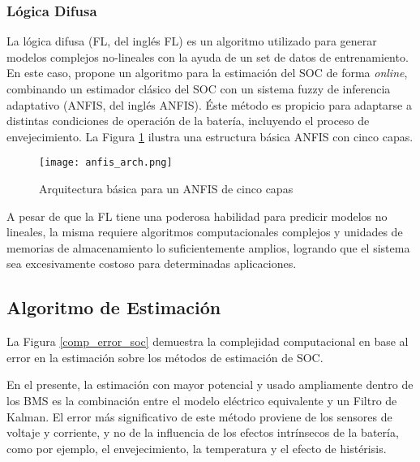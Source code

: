 \subsubsection{L\'ogica Difusa}

\noindent La l\'ogica difusa (\acrshort{FL}, del ingl\'es \acrlong{FL}) es un
algoritmo utilizado para generar modelos complejos no-lineales con la ayuda de
un set de datos de entrenamiento. En este caso, \cite{DAI2015350} propone un 
algoritmo para la estimaci\'on del \acrshort{SOC} de forma \emph{online},
combinando un estimador cl\'asico del \acrshort{SOC} con un sistema fuzzy de
inferencia adaptativo (\acrshort{ANFIS}, del ingl\'es \acrlong{ANFIS}). \'Este
m\'etodo es propicio para adaptarse a distintas condiciones de operaci\'on de la
bater\'ia, incluyendo el proceso de envejecimiento. La Figura \ref{anfis_arch}
ilustra una estructura b\'asica \acrshort{ANFIS} con cinco capas.

\begin{figure}[h!]
    \begin{center}
        \texttt{[image: anfis\_arch.png]}
        \caption{Arquitectura b\'asica para un \acrshort{ANFIS} de cinco capas}
        \label{anfis_arch}
    \end{center}
\end{figure}

\noindent A pesar de que la \acrshort{FL} tiene una poderosa habilidad para 
predicir modelos no lineales, la misma requiere algoritmos computacionales 
complejos y unidades de memorias de almacenamiento lo suficientemente amplios, 
logrando que el sistema sea excesivamente costoso para determinadas 
aplicaciones.

\newpage

\subsection{Algoritmo de Estimaci\'on}

\noindent La Figura \ref{comp_error_soc} demuestra la complejidad computacional 
en base al error en la estimaci\'on sobre los m\'etodos de estimaci\'on de 
\acrshort{SOC}.

\noindent En el presente, la estimaci\'on con mayor potencial y usado
ampliamente dentro de los \acrshort{BMS} es la combinaci\'on entre el modelo
el\'ectrico equivalente y un Filtro de Kalman. El error m\'as significativo de
este m\'etodo proviene de los sensores de voltaje y corriente, y no de la
influencia de los efectos intr\'insecos de la bater\'ia, como por ejemplo, el
envejecimiento, la temperatura y el efecto de hist\'erisis.

